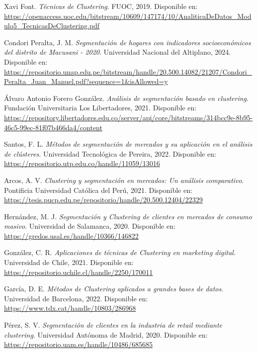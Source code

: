 \documentclass[12pt]{book}
\begin{document}
	\begin{thebibliography}{15}
		
		Xavi Font. \textit{Técnicas de Clustering}. FUOC, 2019. 
		Disponible en: \url{https://openaccess.uoc.edu/bitstream/10609/147174/10/AnaliticaDeDatos_Modulo5_TecnicasDeClustering.pdf}
		
		Condori Peralta, J. M. \textit{Segmentación de hogares con indicadores socioeconómicos del distrito de Macusani - 2020}. Universidad Nacional del Altiplano, 2024.  
		Disponible en: \url{https://repositorio.unap.edu.pe/bitstream/handle/20.500.14082/21207/Condori_Peralta_Juan_Manuel.pdf?sequence=1&isAllowed=y}
		
		Álvaro Antonio Forero González. \textit{Análisis de segmentación basado en clustering}. Fundación Universitaria Los Libertadores, 2021.  
		Disponible en: \url{https://repository.libertadores.edu.co/server/api/core/bitstreams/314bcc9e-8b95-46c5-99ec-81f07b466da4/content}
		
		Santos, F. L. \textit{Métodos de segmentación de mercados y su aplicación en el análisis de clústeres}. Universidad Tecnológica de Pereira, 2022.  
		Disponible en: \url{https://repositorio.utp.edu.co/handle/11059/13016}
		
		Arcos, A. V. \textit{Clustering y segmentación en mercados: Un análisis comparativo}. Pontificia Universidad Católica del Perú, 2021.  
		Disponible en: \url{https://tesis.pucp.edu.pe/repositorio/handle/20.500.12404/22329}
		
		Hernández, M. J. \textit{Segmentación y Clustering de clientes en mercados de consumo masivo}. Universidad de Salamanca, 2020.  
		Disponible en: \url{https://gredos.usal.es/handle/10366/146822}
		
		González, C. R. \textit{Aplicaciones de técnicas de Clustering en marketing digital}. Universidad de Chile, 2021.  
		Disponible en: \url{https://repositorio.uchile.cl/handle/2250/170011}
		
		García, D. E. \textit{Métodos de Clustering aplicados a grandes bases de datos}. Universidad de Barcelona, 2022.  
		Disponible en: \url{https://www.tdx.cat/handle/10803/286968}
		
		Pérez, S. V. \textit{Segmentación de clientes en la industria de retail mediante clustering}. Universidad Autónoma de Madrid, 2020.  
		Disponible en: \url{https://repositorio.uam.es/handle/10486/685685}
		

\end{thebibliography}
\end{document}
